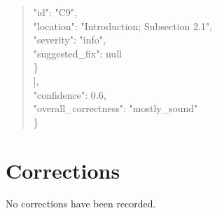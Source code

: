 \documentclass[11pt]{article}
\begin{document}
\begin{quote}
      "id": "C9",\\
      "location": "Introduction; Subsection 2.1",\\
      "severity": "info",\\
      "suggested\_fix": null\\
    \}\\
  ],\\
  "confidence": 0.6,\\
  "overall\_correctness": "mostly\_sound"\\
\}\\
\end{quote}

\section*{Corrections}
No corrections have been recorded.
\end{document}
